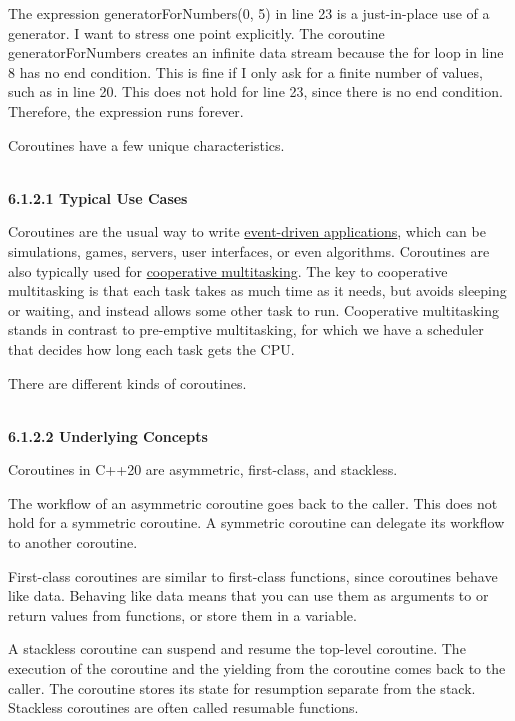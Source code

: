 The expression generatorForNumbers(0, 5) in line 23 is a just-in-place use of a generator. I want to stress one point explicitly. The coroutine generatorForNumbers creates an infinite data stream because the for loop in line 8 has no end condition. This is fine if I only ask for a finite number of values, such as in line 20. This does not hold for line 23, since there is no end condition. Therefore, the expression runs forever.


Coroutines have a few unique characteristics.

\hspace*{\fill} \\ %
\noindent
\textbf{6.1.2.1\hspace{0.2cm} Typical Use Cases}

Coroutines are the usual way to write \href{https://en.wikipedia.org/wiki/Event-driven_programming}{event-driven applications}, which can be simulations, games, servers, user interfaces, or even algorithms. Coroutines are also typically used for \href{https://en.wikipedia.org/wiki/Computer_multitasking}{cooperative multitasking}. The key to cooperative multitasking is that each task takes as much time as it needs, but avoids sleeping or waiting, and instead allows some other task to run. Cooperative multitasking stands in contrast to pre-emptive multitasking, for which we have a scheduler that decides how long each task gets the CPU.

There are different kinds of coroutines.

\hspace*{\fill} \\ %
\noindent
\textbf{6.1.2.2\hspace{0.2cm} Underlying Concepts}

Coroutines in C++20 are asymmetric, first-class, and stackless.

The workflow of an asymmetric coroutine goes back to the caller. This does not hold for a symmetric coroutine. A symmetric coroutine can delegate its workflow to another coroutine.

First-class coroutines are similar to first-class functions, since coroutines behave like data. Behaving like data means that you can use them as arguments to or return values from functions, or store them in a variable.

A stackless coroutine can suspend and resume the top-level coroutine. The execution of the coroutine and the yielding from the coroutine comes back to the caller. The coroutine stores its state for resumption separate from the stack. Stackless coroutines are often called resumable functions.

